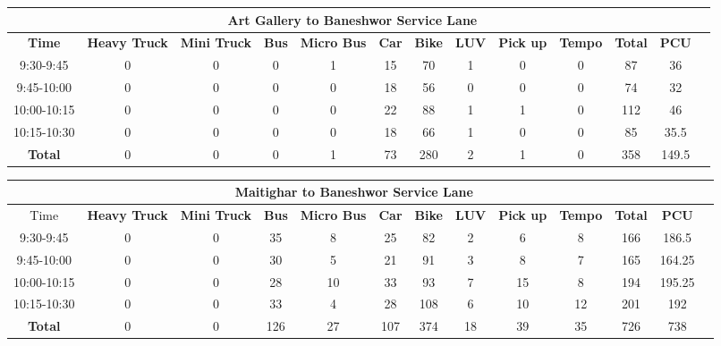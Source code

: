 \begin{landscape}
\centering
\begin{table}[h!]
\centering
\begin{tabular}{|c|c|c|c|c|c|c|c|c|c|c|c|c|}
    \hline
    \multicolumn{12}{|c|}{\textbf{Art Gallery to Baneshwor Service Lane}} \\
    \hline
    \textbf{Time} & \textbf{Heavy Truck} & \textbf{Mini Truck} & \textbf{Bus} & \textbf{Micro Bus} & \textbf{Car} & \textbf{Bike} & \textbf{LUV} & \textbf{Pick up} & \textbf{Tempo} & \textbf{\textbf{Total}} & \textbf{PCU} \\
    \hline
9:30-9:45	&0	&0	&0	&1	&15	&70	&1	&0	&0	&87	&36 \\ \hline
9:45-10:00	&0	&0	&0	&0	&18	&56	&0	&0	&0	&74	&32 \\ \hline
10:00-10:15	&0	&0	&0	&0	&22	&88	&1	&1	&0	&112	&46 \\ \hline
10:15-10:30	&0	&0	&0	&0	&18	&66	&1	&0	&0	&85	&35.5 \\ \hline
\textbf{Total}	&0	&0	&0	&1	&73	&280	&2	&1	&0	&358	&149.5 \\ \hline

\end{tabular}

\vspace{0.5cm}


\begin{tabular}{|c|c|c|c|c|c|c|c|c|c|c|c|c|}
    \hline
    \multicolumn{12}{|c|}{\textbf{Maitighar to Baneshwor Service Lane}} \\
    \hline
    Time & \textbf{Heavy Truck} & \textbf{Mini Truck} & \textbf{Bus} & \textbf{Micro Bus} & \textbf{Car} & \textbf{Bike} & \textbf{LUV} & \textbf{Pick up} & \textbf{Tempo} & \textbf{\textbf{Total}} & \textbf{PCU} \\
    \hline
9:30-9:45	&0	&0	&35	&8	&25	&82	&2	&6	&8	&166	&186.5 \\ \hline
9:45-10:00	&0	&0	&30	&5	&21	&91	&3	&8	&7	&165	&164.25 \\ \hline
10:00-10:15	&0	&0	&28	&10	&33	&93	&7	&15	&8	&194	&195.25 \\ \hline
10:15-10:30	&0	&0	&33	&4	&28	&108	&6	&10	&12	&201	&192 \\ \hline
\textbf{Total}	&0	&0	&126	&27	&107	&374	&18	&39	&35	&726	&738 \\ \hline
\end{tabular}


\end{table}
\end{landscape}
